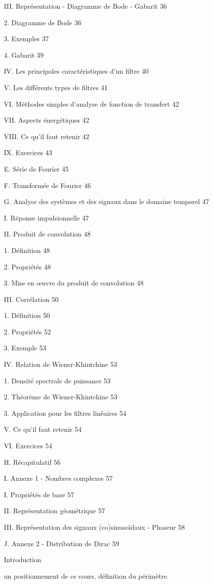 \documentclass[]{article}
\begin{document}
III. Représentation - Diagramme de Bode - Gabarit 36

2. Diagramme de Bode 36

3. Exemples 37

4. Gabarit 39

IV. Les principales caractéristiques d'un filtre 40

V. Les différents types de filtres 41

VI. Méthodes simples d'analyse de fonction de transfert 42

VII. Aspects énergétiques 42

VIII. Ce qu'il faut retenir 42

IX. Exercices 43

E. Série de Fourier 45

F. Transformée de Fourier 46

G. Analyse des systèmes et des signaux dans le domaine temporel 47

I. Réponse impulsionnelle 47

II. Produit de convolution 48

1. Définition 48

2. Propriétés 48

3. Mise en œuvre du produit de convolution 48

III. Corrélation 50

1. Définition 50

2. Propriétés 52

3. Exemple 53

IV. Relation de Wiener-Khintchine 53

1. Densité spectrale de puissance 53

2. Théorème de Wiener-Khintchine 53

3. Application pour les filtres linéaires 54

V. Ce qu'il faut retenir 54

VI. Exercices 54

H. Récapitulatif 56

I. Annexe 1 - Nombres complexes 57

I. Propriétés de base 57

II. Représentation géométrique 57

III. Représentation des signaux (co)sinusoïdaux - Phaseur 58

J. Annexe 2 - Distribution de Dirac 59

Introduction

un positionnement de ce cours, définition du périmètre.
\end{document}
